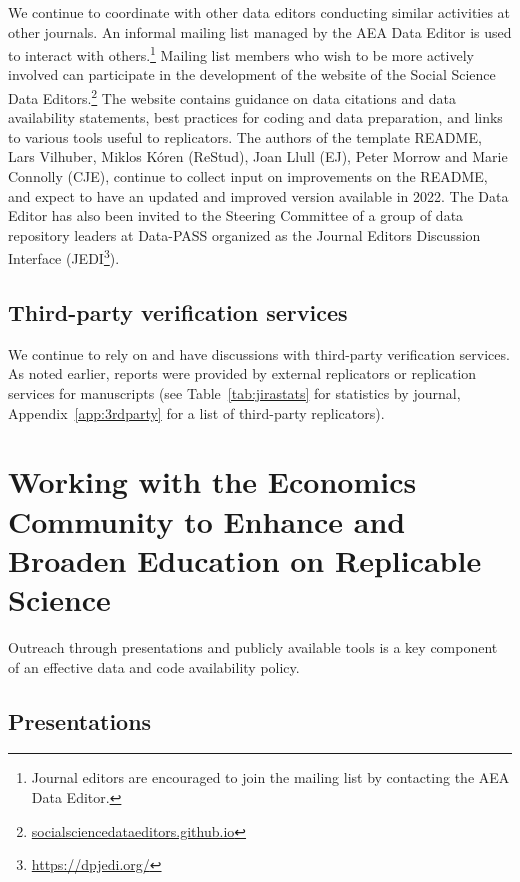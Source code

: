 \documentclass[PP]{AEA}
\newcommand{\urlcite}[2]{#2\footnote{\url{#1}}}
\newcommand{\purlcite}[2]{#2.\footnote{\url{#1}}}
\begin{document}
We continue to coordinate with other data editors conducting similar activities at other journals. An informal mailing list managed by the AEA Data Editor is used to interact with others.\footnote{Journal editors are encouraged to join the mailing list by contacting the AEA Data Editor.} Mailing list members who wish to be more actively involved can participate in the development of the \purlcite{socialsciencedataeditors.github.io}{website of the Social Science Data Editors} The website contains guidance on data citations and data availability statements, best practices for coding and data preparation, and links to various tools useful to replicators. The authors of the template README, Lars Vilhuber, Miklos Kóren (\acl{ReStud}), Joan Llull (\acl{EJ}), Peter Morrow and Marie Connolly (\acl{CJE}), continue to collect input on improvements on the README, and expect to have an updated and improved version available in 2022. The Data Editor has also been invited to the Steering Committee of a group of data repository leaders at Data-PASS organized as the Journal Editors Discussion Interface (\urlcite{https://dpjedi.org/}{JEDI}).


\subsection{Third-party verification services}
\label{sec:3rdparty}


We continue to rely on and have discussions with third-party verification services. As noted earlier, \jiraexternal{} reports were provided by external replicators or replication services for \jiramcsexternal{} manuscripts (see Table~\ref{tab:jirastats} for statistics by journal, Appendix~\ref{app:3rdparty} for a list of third-party replicators). 

\section{Working with the Economics Community to Enhance and Broaden Education on Replicable Science}

Outreach through presentations and publicly available tools is a key component of an effective data and code availability policy. 

\subsection{Presentations}
\end{document}

